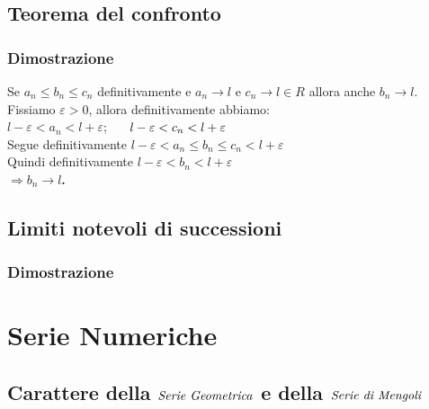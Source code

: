 \documentclass[11pt, a4paper]{article}
\begin{document}
\subsection{Teorema del confronto}
\subsubsection*{Dimostrazione}
Se $a_n \leq b_n \leq c_n$ definitivamente e $a_n \rightarrow l$ e $c_n \rightarrow l \in R$ allora anche $b_n \rightarrow l$.\\
Fissiamo $\varepsilon>0$, allora definitivamente abbiamo: \\$l-\varepsilon<a_n<l+\varepsilon$; $\hspace{0.5cm} l-\varepsilon<c_n<l+\varepsilon$\\ Segue definitivamente $l-\varepsilon<a_n \leq b_n \leq c_n<l+\varepsilon$\\ Quindi definitivamente $l-\varepsilon<b_n<l+\varepsilon$\\
\textbf{$\Longrightarrow b_n\rightarrow l$.}

\subsection{Limiti notevoli di successioni}
\subsubsection*{Dimostrazione}

\newpage

\section{Serie Numeriche}
\subsection{Carattere della $\emph{Serie Geometrica}$ e della $\emph{Serie di Mengoli}$}
\end{document}
